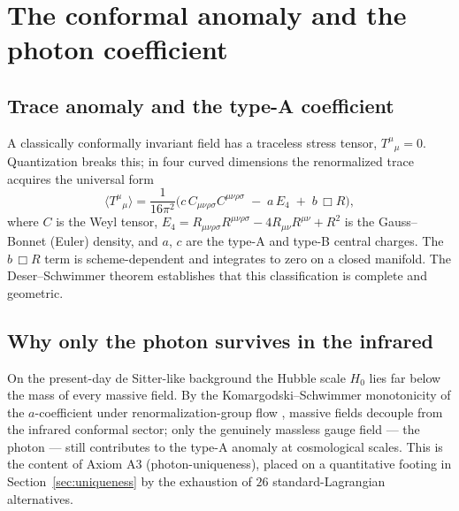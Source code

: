 \documentclass[11pt,a4paper]{article}
\theoremstyle{plain}
\theoremstyle{definition}
\theoremstyle{remark}
\newcommand{\avg}[1]{\langle #1 \rangle}
\begin{document}
\section{The conformal anomaly and the photon coefficient}
\label{sec:anomaly}

\subsection{Trace anomaly and the type-A coefficient}
A classically conformally invariant field has a traceless stress tensor, $T^\mu{}_\mu = 0$.
Quantization breaks this; in four curved dimensions the renormalized trace acquires the
universal form \cite{DS1993,Duff1994}
\begin{equation}
\label{eq:anomaly}
\avg{T^\mu{}_\mu} = \frac{1}{16\pi^2}\Big( c\, C_{\mu\nu\rho\sigma}C^{\mu\nu\rho\sigma}
  \;-\; a\, E_4 \;+\; b\,\Box R \Big),
\end{equation}
where $C$ is the Weyl tensor, $E_4 = R_{\mu\nu\rho\sigma}R^{\mu\nu\rho\sigma}
- 4 R_{\mu\nu}R^{\mu\nu} + R^2$ is the Gauss--Bonnet (Euler) density, and $a$, $c$ are the
type-A and type-B central charges. The $b\,\Box R$ term is scheme-dependent and integrates to
zero on a closed manifold. The Deser--Schwimmer theorem \cite{DS1993} establishes that this
classification is complete and geometric.

\subsection{Why only the photon survives in the infrared}
On the present-day de Sitter-like background the Hubble scale $H_0$ lies far below the mass of
every massive field. By the Komargodski--Schwimmer monotonicity of the $a$-coefficient under
renormalization-group flow \cite{KomargodskiSchwimmer2011}, massive fields decouple from the
infrared conformal sector; only the genuinely massless gauge field --- the photon --- still
contributes to the type-A anomaly at cosmological scales. This is the content of Axiom A3
(photon-uniqueness), placed on a quantitative footing in Section~\ref{sec:uniqueness} by the
exhaustion of $26$ standard-Lagrangian alternatives.
\end{document}
